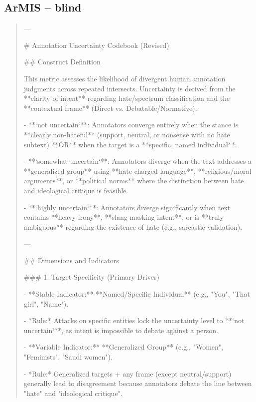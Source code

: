 \subsection*{ArMIS -- blind}
\begin{quote}\small
---

# Annotation Uncertainty Codebook (Revised)



## Construct Definition

This metric assesses the likelihood of divergent human annotation judgments across repeated intersects. Uncertainty is derived from the **clarity of intent** regarding hate/spectrum classification and the **contextual frame** (Direct vs. Debatable/Normative).



- **`not uncertain`**: Annotators converge entirely when the stance is **clearly non-hateful** (support, neutral, or nonsense with no hate subtext) **OR** when the target is a **specific, named individual**.

- **`somewhat uncertain`**: Annotators diverge when the text addresses a **generalized group** using **hate-charged language**, **religious/moral arguments**, or **political norms** where the distinction between hate and ideological critique is feasible.

- **`highly uncertain`**: Annotators diverge significantly when text contains **heavy irony**, **slang masking intent**, or is **truly ambiguous** regarding the existence of hate (e.g., sarcastic validation).



---



## Dimensions and Indicators



### 1. Target Specificity (Primary Driver)

- **Stable Indicator:** **Named/Specific Individual** (e.g., "You", "That girl", "Name").

    - *Rule:* Attacks on specific entities lock the uncertainty level to **`not uncertain`**, as intent is impossible to debate against a person.

- **Variable Indicator:** **Generalized Group** (e.g., "Women", "Feminists", "Saudi women").

    - *Rule:* Generalized targets + any frame (except neutral/support) generally lead to disagreement because annotators debate the line between "hate" and "ideological critique".


\end{quote}
